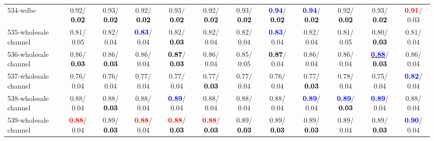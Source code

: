 \begin{table}[h]
\begin{center}
{\begin{tabular}{lc|c|c|c|c|c|c|c|c|c|c}
534-wdbc &   0.92/\textcolor{black}{\textbf{  0.02}} &   0.93/\textcolor{black}{\textbf{  0.02}} &   0.92/\textcolor{black}{\textbf{  0.02}} &   0.93/\textcolor{black}{\textbf{  0.02}} &   0.92/\textcolor{black}{\textbf{  0.02}} &   0.93/\textcolor{black}{\textbf{  0.02}} & \textcolor{blue}{\textbf{  0.94}}/\textcolor{black}{\textbf{  0.02}} & \textcolor{blue}{\textbf{  0.94}}/\textcolor{black}{\textbf{  0.02}} &   0.92/\textcolor{black}{\textbf{  0.02}} &   0.93/\textcolor{black}{\textbf{  0.02}} & \textcolor{red}{\textbf{  0.91}}/  0.03 \\
535-wholesale channel &   0.81/  0.05 &   0.82/  0.04 & \textcolor{blue}{\textbf{  0.83}}/  0.04 &   0.82/\textcolor{black}{\textbf{  0.03}} &   0.82/  0.04 &   0.82/  0.04 & \textcolor{blue}{\textbf{  0.83}}/  0.04 &   0.82/  0.04 &   0.81/  0.05 &   0.80/\textcolor{black}{\textbf{  0.03}} &   0.81/  0.04 \\
536-wholesale channel &   0.86/\textcolor{black}{\textbf{  0.03}} &   0.86/\textcolor{black}{\textbf{  0.03}} &   0.86/  0.04 & \textcolor{black}{\textbf{  0.87}}/\textcolor{black}{\textbf{  0.03}} &   0.86/  0.04 &   0.85/  0.05 & \textcolor{black}{\textbf{  0.87}}/  0.04 &   0.86/  0.04 &   0.86/  0.04 & \underline{\textcolor{blue}{\textbf{  0.88}}}/\textcolor{black}{\textbf{  0.03}} &   0.86/  0.04 \\
537-wholesale channel &   0.76/  0.04 &   0.76/  0.04 &   0.77/  0.04 &   0.77/  0.04 &   0.77/\textcolor{black}{\textbf{  0.03}} &   0.77/  0.04 &   0.76/  0.04 &   0.77/\textcolor{black}{\textbf{  0.03}} &   0.78/  0.04 &   0.75/  0.04 & \textcolor{blue}{\textbf{  0.82}}/  0.04 \\
538-wholesale channel &   0.88/  0.04 &   0.88/\textcolor{black}{\textbf{  0.03}} &   0.88/  0.04 & \textcolor{blue}{\textbf{  0.89}}/  0.04 &   0.88/  0.04 &   0.88/  0.04 &   0.88/  0.04 & \textcolor{blue}{\textbf{  0.89}}/  0.04 & \textcolor{blue}{\textbf{  0.89}}/\textcolor{black}{\textbf{  0.03}} & \textcolor{blue}{\textbf{  0.89}}/  0.04 &   0.88/  0.04 \\
539-wholesale channel & \textcolor{red}{\textbf{  0.88}}/  0.04 &   0.89/\textcolor{black}{\textbf{  0.03}} & \textcolor{red}{\textbf{  0.88}}/  0.04 & \textcolor{red}{\textbf{  0.88}}/\textcolor{black}{\textbf{  0.03}} & \textcolor{red}{\textbf{  0.88}}/\textcolor{black}{\textbf{  0.03}} &   0.89/\textcolor{black}{\textbf{  0.03}} &   0.89/\textcolor{black}{\textbf{  0.03}} &   0.89/\textcolor{black}{\textbf{  0.03}} &   0.89/  0.04 &   0.89/\textcolor{black}{\textbf{  0.03}} & \textcolor{blue}{\textbf{  0.90}}/  0.04 \\

\end{tabular}}
\end{center}
\end{table}
